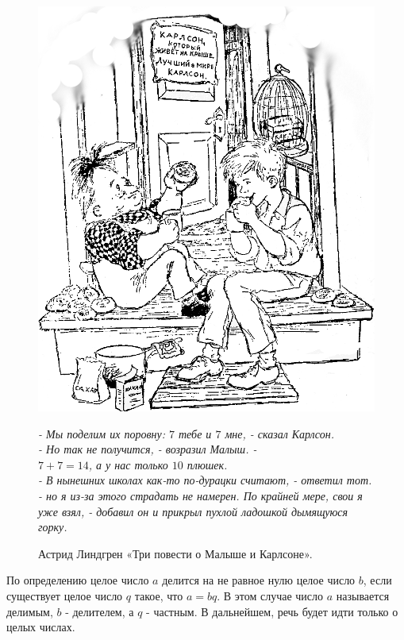 
\begin{figure}[H]
\begin{minipage}{0.4\linewidth}
\includegraphics[width=0.9\columnwidth]{./img/karlson}
\end{minipage}
\begin{minipage}{0.55\linewidth}
\epigraph{
\textit{- Мы поделим их поровну: $7$ тебе и $7$ мне, - сказал Карлсон.\\
- Но так не получится, - возразил Малыш. -\\  $7+7=14$, а у нас только $10$ плюшек.\\
- В нынешних школах как-то по-дурацки считают, - ответил тот. - но я из-за этого страдать не намерен. По крайней мере, свои я уже взял, - добавил он и прикрыл пухлой ладошкой дымящуюся горку.
}}{Астрид Линдгрен «Три повести о Малыше и Карлсоне».}
\end{minipage}
\end{figure}

По определению целое число $a$ делится на не равное нулю целое число $b$, если существует целое число $q$ такое, что $a = bq$. В этом случае число $a$ называется делимым, $b$ - делителем, а $q$ - частным. В дальнейшем, речь будет идти только о целых числах.

